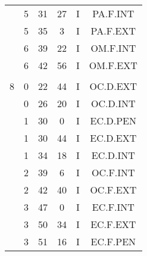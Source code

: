 \documentclass[12pt, a4paper]{article}
\begin{document}
\begin{multicols}{3}
{\begin{tabular}{c c c c c c}
	 	 	 	 & 5 & 31 & 27 & I & PA.F.INT\\%
	 	 	 	 & 5 & 35 & 3 & I & PA.F.EXT\\%
	 	 	 	 & 6 & 39 & 22 & I & OM.F.INT\\%
	 	 	 	 & 6 & 42 & 56 & I & OM.F.EXT\\%
	 	 	 	 & & & & & \\%
	 	 	 	8 & 0 & 22 & 44 & I & OC.D.EXT\\%
	 	 	 	 & 0 & 26 & 20 & I & OC.D.INT\\%
	 	 	 	 & 1 & 30 & 0 & I & EC.D.PEN\\%
	 	 	 	 & 1 & 30 & 44 & I & EC.D.EXT\\%
	 	 	 	 & 1 & 34 & 18 & I & EC.D.INT\\%
	 	 	 	 & 2 & 39 & 6 & I & OC.F.INT\\%
	 	 	 	 & 2 & 42 & 40 & I & OC.F.EXT\\%
	 	 	 	 & 3 & 47 & 0 & I & EC.F.INT\\%
	 	 	 	 & 3 & 50 & 34 & I & EC.F.EXT\\%
	 	 	 	 & 3 & 51 & 16 & I & EC.F.PEN\\%
	 	 \end{tabular}
 	}
\end{multicols}
\end{document}
